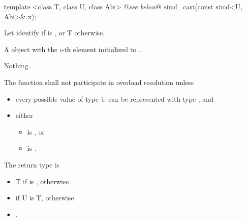 \begin{itemdecl}
  template <class T, class U, class Abi> @\emph{see below}@ simd_cast(const simd<U, Abi>& x);
\end{itemdecl}
\begin{itemdescr}
  \pnum Let  identify  if  is \true, or \type T otherwise.

  \pnum\returns A \simd object with the $i$-th element initialized to  \foralli.

  \pnum\throws Nothing.

  \pnum\remarks The function shall not participate in overload resolution unless
  \begin{itemize}
    \item every possible value of type \type U can be represented with type , and
    \item either
      \begin{itemize}
        \item {} is \false, or
        \item {} is \true.
      \end{itemize}
  \end{itemize}

  \pnum
  The return type is
  \begin{itemize}
    \item \type T if  is \true, otherwise
    \item \simd[<T, Abi>] if \type U is \type T, otherwise
    \item {}.
  \end{itemize}

\end{itemdescr}

